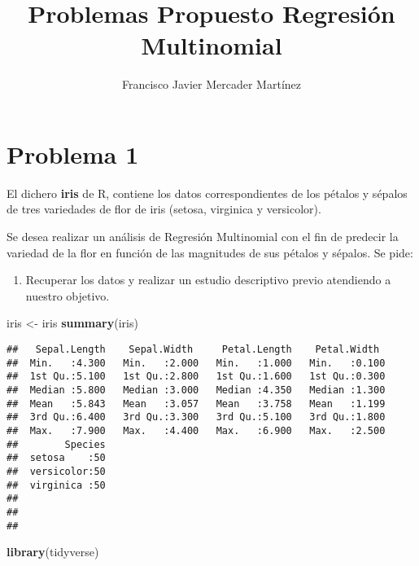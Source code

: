 \documentclass[
]{article}
\title{Problemas Propuesto Regresión Multinomial}
\author{Francisco Javier Mercader Martínez}
\date{}
\newenvironment{Shaded}{\begin{snugshade}}{\end{snugshade}}
\newcommand{\FunctionTok}[1]{\textcolor[rgb]{0.13,0.29,0.53}{\textbf{#1}}}
\newcommand{\NormalTok}[1]{#1}
\newcommand{\OtherTok}[1]{\textcolor[rgb]{0.56,0.35,0.01}{#1}}
\providecommand{\tightlist}{%
  \setlength{\itemsep}{0pt}\setlength{\parskip}{0pt}}
\begin{document}
\maketitle

\hypertarget{problema-1}{%
\section{Problema 1}\label{problema-1}}

El dichero \textbf{iris} de R, contiene los datos correspondientes de
los pétalos y sépalos de tres variedades de flor de iris (setosa,
virginica y versicolor).

Se desea realizar un análisis de Regresión Multinomial con el fin de
predecir la variedad de la flor en función de las magnitudes de sus
pétalos y sépalos. Se pide:

\begin{enumerate}
\def\labelenumi{\arabic{enumi})}
\tightlist
\item
  Recuperar los datos y realizar un estudio descriptivo previo
  atendiendo a nuestro objetivo.
\end{enumerate}

\begin{Shaded}
\begin{Highlighting}[]
\NormalTok{iris }\OtherTok{\textless{}{-}}\NormalTok{ iris}
\FunctionTok{summary}\NormalTok{(iris)}
\end{Highlighting}
\end{Shaded}

\begin{verbatim}
##   Sepal.Length    Sepal.Width     Petal.Length    Petal.Width   
##  Min.   :4.300   Min.   :2.000   Min.   :1.000   Min.   :0.100  
##  1st Qu.:5.100   1st Qu.:2.800   1st Qu.:1.600   1st Qu.:0.300  
##  Median :5.800   Median :3.000   Median :4.350   Median :1.300  
##  Mean   :5.843   Mean   :3.057   Mean   :3.758   Mean   :1.199  
##  3rd Qu.:6.400   3rd Qu.:3.300   3rd Qu.:5.100   3rd Qu.:1.800  
##  Max.   :7.900   Max.   :4.400   Max.   :6.900   Max.   :2.500  
##        Species  
##  setosa    :50  
##  versicolor:50  
##  virginica :50  
##                 
##                 
## 
\end{verbatim}

\begin{Shaded}
\begin{Highlighting}[]
\FunctionTok{library}\NormalTok{(tidyverse)}
\end{Highlighting}
\end{Shaded}
\end{document}
